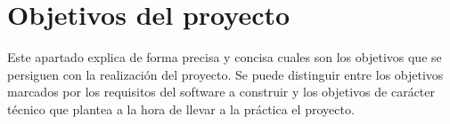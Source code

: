 \chapter{Objetivos del proyecto} %
\label{cha:Objetivos del proyecto}

Este apartado explica de forma precisa y concisa cuales son los objetivos que
se persiguen con la realización del proyecto. Se puede distinguir entre los
objetivos marcados por los requisitos del software a construir y los objetivos
de carácter técnico que plantea a la hora de llevar a la práctica el proyecto.

